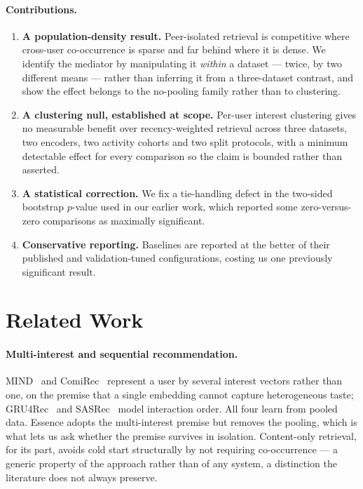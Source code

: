 \documentclass[runningheads,a4paper]{llncs}
\begin{document}
\paragraph{Contributions.}
\begin{enumerate}
\item \textbf{A population-density result.} Peer-isolated retrieval is competitive where
cross-user co-occurrence is sparse and far behind where it is dense. We identify the
mediator by manipulating it \emph{within} a dataset --- twice, by two different means ---
rather than inferring it from a three-dataset contrast, and show the effect belongs to the
no-pooling family rather than to clustering.
\item \textbf{A clustering null, established at scope.} Per-user interest clustering gives
no measurable benefit over recency-weighted retrieval across three datasets, two encoders,
two activity cohorts and two split protocols, with a minimum detectable effect for every
comparison so the claim is bounded rather than asserted.
\item \textbf{A statistical correction.} We fix a tie-handling defect in the two-sided
bootstrap $p$-value used in our earlier work, which reported some zero-versus-zero
comparisons as maximally significant.
\item \textbf{Conservative reporting.} Baselines are reported at the better of their
published and validation-tuned configurations, costing us one previously significant
result.
\end{enumerate}

\section{Related Work}

\paragraph{Multi-interest and sequential recommendation.} MIND~\cite{li2019mind} and
ComiRec~\cite{cen2020controllable} represent a user by several interest vectors rather than
one, on the premise that a single embedding cannot capture heterogeneous taste;
GRU4Rec~\cite{hidasi2016session} and SASRec~\cite{kang2018self} model interaction order.
All four learn from pooled data. Essence adopts the multi-interest premise but removes the
pooling, which is what lets us ask whether the premise survives in isolation. Content-only
retrieval, for its part, avoids cold start structurally by not requiring co-occurrence --- a
generic property of the approach rather than of any system, a distinction the literature
does not always preserve.
\end{document}

